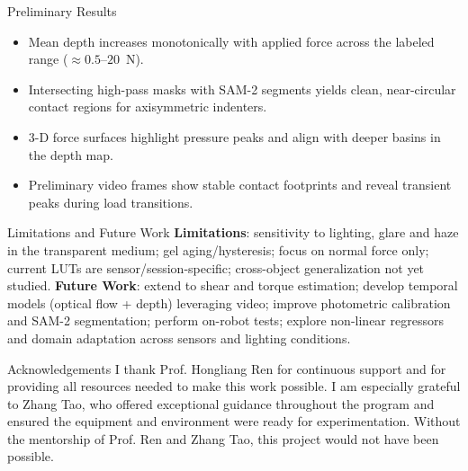 \documentclass[final]{beamer}
\newlength{\colwidth}
\begin{document}
\begin{frame}[t]
\begin{columns}[t]
\begin{column}{\colwidth}
  \begin{block}{Preliminary Results}
  \begin{itemize}
    \item Mean depth increases monotonically with applied force across the labeled range (\(\approx 0.5\)–\(20\)~N).
    \item Intersecting high-pass masks with SAM-2 segments yields clean, near-circular contact regions for axisymmetric indenters.
    \item 3-D force surfaces highlight pressure peaks and align with deeper basins in the depth map.
    \item Preliminary video frames show stable contact footprints and reveal transient peaks during load transitions.
  \end{itemize}
  \end{block}

  \begin{exampleblock}{Limitations and Future Work}
  \textbf{Limitations}: sensitivity to lighting, glare and haze in the transparent medium; gel aging/hysteresis; focus on normal force only; current LUTs are sensor/session-specific; cross-object generalization not yet studied.
  \vspace{0.5em}
  \textbf{Future Work}: extend to shear and torque estimation; develop temporal models (optical flow + depth) leveraging video; improve photometric calibration and SAM-2 segmentation; perform on-robot tests; explore non-linear regressors and domain adaptation across sensors and lighting conditions.
  \end{exampleblock}

  \begin{block}{Acknowledgements}
  I thank Prof. Hongliang Ren for continuous support and for providing all resources needed to make this work possible. I am especially grateful to Zhang Tao, who offered exceptional guidance throughout the program and ensured the equipment and environment were ready for experimentation. Without the mentorship of Prof. Ren and Zhang Tao, this project would not have been possible.
  \end{block}


\end{column}
\end{columns}
\end{frame}
\end{document}
